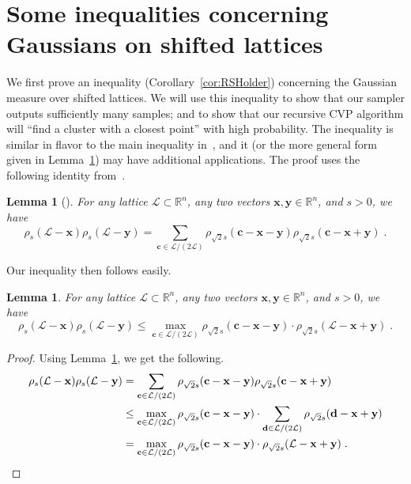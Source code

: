 \documentclass[11pt]{article}
\newtheorem{lemma}[theorem]{Lemma}
\newcommand{\R}{\ensuremath{\mathbb{R}}}
\renewcommand{\vec}[1]{\ensuremath{\mathbf{#1}}}
\newcommand{\problem}[1]{\mbox{#1}\xspace}
\newcommand{\scarequotes}[1]{``#1''}
\newcommand{\lat}{\mathcal{L}}
\begin{document}
\section{Some inequalities concerning Gaussians on shifted lattices}
\label{sec:ineq}
We first prove an inequality (Corollary~\ref{cor:RSHolder}) concerning the Gaussian measure over shifted lattices. We will use this inequality to show that our sampler outputs sufficiently many samples; and to show that our recursive \problem{CVP} algorithm will \scarequotes{find a cluster with a closest point} with high probability. 
The inequality is similar in flavor to the main inequality in~\cite{RegevS15}, and it (or the more general form given in Lemma~\ref{lem:RSHolder}) may have additional applications. The proof uses the following identity from~\cite{RegevS15}.

\begin{lemma}[{\cite[Eq. (3)]{RegevS15}}]
\label{lem:RS15} 
For any lattice $\lat\subset\R^n$, any two vectors $\vec{x}, \vec{y} \in \R^n$, and $s > 0$, we have
\[
\rho_s(\lat - \vec{x}) \rho_s(\lat - \vec{y}) = \sum_{\vec{c} \in \lat / (2\lat)} \rho_{\sqrt{2}s}(\vec{c} - \vec{x} - \vec{y}) \rho_{\sqrt{2}s}(\vec{c} - \vec{x} + \vec{y}) \; .
\]
\end{lemma}

Our inequality then follows easily.

\begin{lemma}
\label{lem:RSHolder}
For any lattice $\lat\subset\R^n$, any two vectors $\vec{x}, \vec{y} \in \R^n$, and $s > 0$, we have
\[
\rho_s(\lat - \vec{x}) \rho_s(\lat - \vec{y}) \leq \max_{\vec{c} \in \lat/(2\lat)} \rho_{\sqrt{2} s}(\vec{c} - \vec{x} - \vec{y}) \cdot \rho_{\sqrt{2}s}(\lat - \vec{x} + \vec{y}) \; .
\]
\end{lemma}
\begin{proof}
Using Lemma~\ref{lem:RS15}, we get the following.
\begin{align*}
\rho_s(\lat - \vec{x}) \rho_s(\lat - \vec{y}) &= \sum_{\vec{c} \in \lat / (2\lat)} \rho_{\sqrt{2}s}(\vec{c} - \vec{x} - \vec{y}) \rho_{\sqrt{2}s}(\vec{c} - \vec{x} + \vec{y})\\
&\leq \max_{\vec{c} \in \lat/(2\lat)} \rho_{\sqrt{2} s}(\vec{c} - \vec{x} - \vec{y}) \cdot \sum_{\vec{d} \in \lat/(2\lat)} \rho_{\sqrt{2}s}(\vec{d} - \vec{x} + \vec{y}) \\
&= \max_{\vec{c} \in \lat/(2\lat)} \rho_{\sqrt{2} s}(\vec{c} - \vec{x} - \vec{y}) \cdot \rho_{\sqrt{2}s}(\lat - \vec{x} + \vec{y}) \; . \qedhere
\end{align*}
\end{proof}
\end{document}
